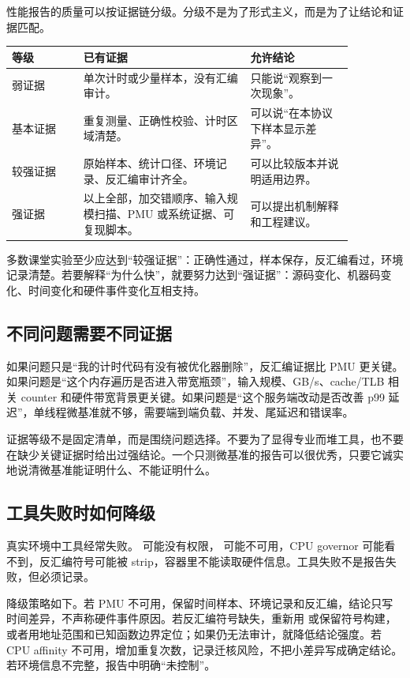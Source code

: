 性能报告的质量可以按证据链分级。分级不是为了形式主义，而是为了让结论和证据匹配。

\begin{center}
\begin{tabular}{p{0.18\linewidth}p{0.42\linewidth}p{0.26\linewidth}}
\toprule
等级 & 已有证据 & 允许结论 \\
\midrule
弱证据 & 单次计时或少量样本，没有汇编审计。 & 只能说“观察到一次现象”。 \\
基本证据 & 重复测量、正确性校验、计时区域清楚。 & 可以说“在本协议下样本显示差异”。 \\
较强证据 & 原始样本、统计口径、环境记录、反汇编审计齐全。 & 可以比较版本并说明适用边界。 \\
强证据 & 以上全部，加交错顺序、输入规模扫描、PMU 或系统证据、可复现脚本。 & 可以提出机制解释和工程建议。 \\
\bottomrule
\end{tabular}
\end{center}

多数课堂实验至少应达到“较强证据”：正确性通过，样本保存，反汇编看过，环境记录清楚。若要解释“为什么快”，就要努力达到“强证据”：源码变化、机器码变化、时间变化和硬件事件变化互相支持。

\subsection{不同问题需要不同证据}

如果问题只是“我的计时代码有没有被优化器删除”，反汇编证据比 PMU 更关键。如果问题是“这个内存遍历是否进入带宽瓶颈”，输入规模、GB/s、cache/TLB 相关 counter 和硬件带宽背景更关键。如果问题是“这个服务端改动是否改善 p99 延迟”，单线程微基准就不够，需要端到端负载、并发、尾延迟和错误率。

证据等级不是固定清单，而是围绕问题选择。不要为了显得专业而堆工具，也不要在缺少关键证据时给出过强结论。一个只测微基准的报告可以很优秀，只要它诚实地说清微基准能证明什么、不能证明什么。

\subsection{工具失败时如何降级}

真实环境中工具经常失败。 可能没有权限， 可能不可用，CPU governor 可能看不到，反汇编符号可能被 strip，容器里不能读取硬件信息。工具失败不是报告失败，但必须记录。

降级策略如下。若 PMU 不可用，保留时间样本、环境记录和反汇编，结论只写时间差异，不声称硬件事件原因。若反汇编符号缺失，重新用  或保留符号构建，或者用地址范围和已知函数边界定位；如果仍无法审计，就降低结论强度。若 CPU affinity 不可用，增加重复次数，记录迁核风险，不把小差异写成确定结论。若环境信息不完整，报告中明确“未控制”。

